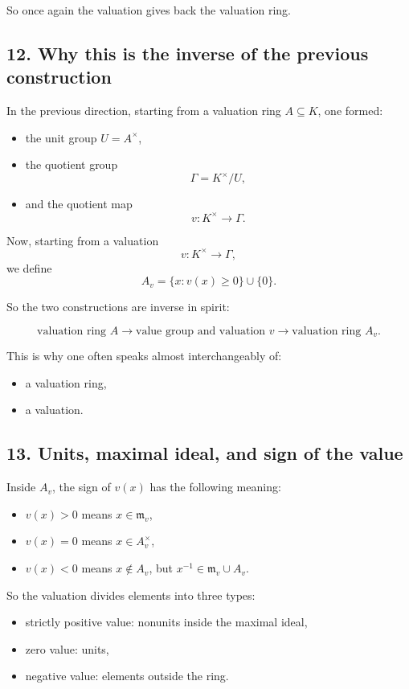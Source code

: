 \documentclass[12pt,a4paper]{article}
\theoremstyle{notespace}
\begin{document}
So once again the valuation gives back the valuation ring.

\subsection{12. Why this is the inverse of the previous construction}

In the previous direction, starting from a valuation ring \(A\subseteq K\), one formed:
\begin{itemize}
	\item the unit group \(U=A^\times\),
	\item the quotient group
	\[
	\Gamma=K^\times/U,
	\]
	\item and the quotient map
	\[
	v:K^\times\to \Gamma.
	\]
\end{itemize}

Now, starting from a valuation
\[
v:K^\times\to \Gamma,
\]
we define
\[
A_v=\{x : v(x)\ge 0\}\cup\{0\}.
\]

So the two constructions are inverse in spirit:

\[
\text{valuation ring } A
\longrightarrow
\text{value group and valuation } v
\longrightarrow
\text{valuation ring } A_v.
\]

This is why one often speaks almost interchangeably of:
\begin{itemize}
	\item a valuation ring,
	\item a valuation.
\end{itemize}

\subsection{13. Units, maximal ideal, and sign of the value}

Inside \(A_v\), the sign of \(v(x)\) has the following meaning:

\begin{itemize}
	\item \(v(x)>0\) means \(x\in \mathfrak m_v\),
	\item \(v(x)=0\) means \(x\in A_v^\times\),
	\item \(v(x)<0\) means \(x\notin A_v\), but \(x^{-1}\in \mathfrak m_v\cup A_v\).
\end{itemize}

So the valuation divides elements into three types:
\begin{itemize}
	\item strictly positive value: nonunits inside the maximal ideal,
	\item zero value: units,
	\item negative value: elements outside the ring.
\end{itemize}
\end{document}
